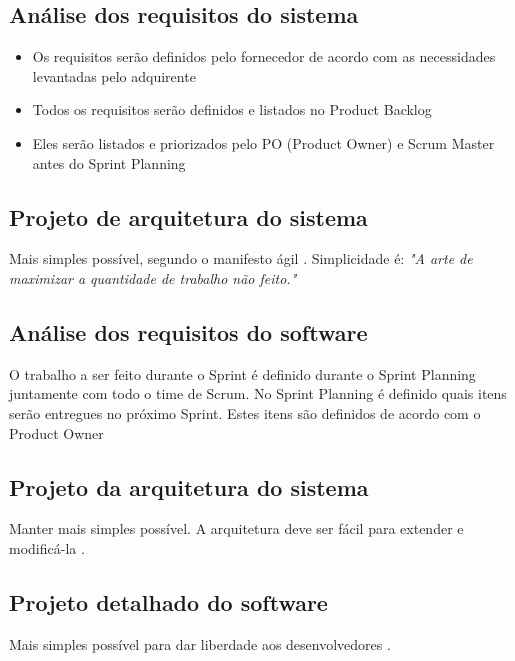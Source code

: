 \subsection{Análise dos requisitos do sistema}

\begin{itemize}
  \item Os requisitos serão definidos pelo fornecedor de acordo com as necessidades levantadas pelo adquirente

  \item Todos os requisitos serão definidos e listados no Product Backlog

  \item Eles serão listados e priorizados pelo PO (Product Owner) e Scrum Master antes do Sprint Planning
\end{itemize}

\subsection{Projeto de arquitetura do sistema}

Mais simples possível, segundo o manifesto ágil \cite{beck2001agile, BecAnd04extreme}. Simplicidade é:
\emph{"A arte de maximizar a quantidade de trabalho não feito."}


\subsection{Análise dos requisitos do software}

O trabalho a ser feito durante o Sprint é definido durante o Sprint Planning juntamente com todo o time de Scrum. No Sprint Planning é definido quais itens serão entregues no próximo Sprint. Estes itens são definidos de acordo com o Product Owner

\subsection{Projeto da arquitetura do sistema}

Manter mais simples possível. A arquitetura deve ser fácil para extender e modificá-la \cite{beck2001agile, BecAnd04extreme}.

\subsection{Projeto detalhado do software}

Mais simples possível para dar liberdade aos desenvolvedores \cite{beck2001agile, BecAnd04extreme}.

